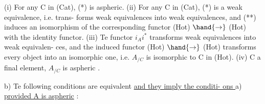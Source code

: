 (i)  For any C in (Cat),  (*) is aspheric.
(ii)  For any C in (Cat),  (*) is a weak equivalence,  i.e.  trans-%
forms weak equivalences  into weak equivalences,  and (**) induces
an isomorphism of the corresponding functor (Hot) $\hand{\to}$ (Hot) with the
identity functor.
(iii)  Te functor $i_{A}i^{*}$  transforms weak equivalences into weak equivalen-%
ces,  and the induced functor (Hot) $\hand{\to}$ (Hot) transforms every object
into an isomorphic one,  i.e.  $A_{/C}$ is isomorphic to C in (Hot).
(iv)    C  a final element,  $A_{/C}$ is aspheric .

b)  Te following conditions are equivalent\over{\unsure{:}}{,} \uline{and they imply the conditi-%
ons } a)  \uline{provided A is aspheric} :
